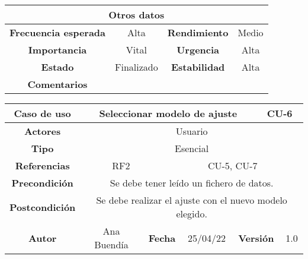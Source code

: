 \begin{table}[!h]
\begin{tabular}{|c|c|c|c|}
\hline
\multicolumn{4}{|c|}{\cellcolor{cyan} \textbf{Otros datos}} \\
\hline
 \cellcolor{cyan} \textbf{Frecuencia esperada}             &     Alta         &    \cellcolor{cyan} \textbf{Rendimiento}          &      Medio        \\
\hline
 \cellcolor{cyan} \textbf{Importancia}             &      Vital         &     \cellcolor{cyan} \textbf{Urgencia}         &     Alta         \\
\hline
 \cellcolor{cyan} \textbf{Estado}             &       Finalizado        &    \cellcolor{cyan} \textbf{Estabilidad}          &     Alta         \\
\hline
 \cellcolor{cyan} \textbf{Comentarios}        &  \multicolumn{3}{|c|}{} \\
\hline
\end{tabular}
\end{table}




\clearpage

\begin{table}[!h]
\begin{tabular}{|c|c|c|c|c|c|c|c|}
\hline
\rowcolor{cyan} \textbf{Caso de uso} & \multicolumn{5}{|c|}{Seleccionar modelo de ajuste} & \multicolumn{2}{|c|}{CU-6} \\
\hline
\cellcolor{cyan} \textbf{Actores}              & \multicolumn{7}{|c|}{Usuario}           \\
\hline
\cellcolor{cyan} \textbf{Tipo}                 & \multicolumn{7}{|c|}{Esencial}             \\
\hline
\cellcolor{cyan} \textbf{Referencias}          & \multicolumn{2}{|c|}{RF2}           & \multicolumn{5}{|c|}{CU-5, CU-7}\\
\hline
\cellcolor{cyan} \textbf{Precondición}         & \multicolumn{7}{|c|}{Se debe tener leído un fichero de datos.}             \\
\hline
\cellcolor{cyan} \textbf{Postcondición}        & \multicolumn{7}{|c|}{Se debe realizar el ajuste con el nuevo modelo elegido.}              \\
\hline
\cellcolor{cyan} \textbf{Autor}                &   Ana Buendía   & \multicolumn{2}{|c|}{\cellcolor{cyan} \textbf{Fecha}} &  25/04/22   & \multicolumn{2}{|c|}{\cellcolor{cyan} \textbf{Versión}} & 1.0  \\
\hline
\end{tabular}
\end{table}

